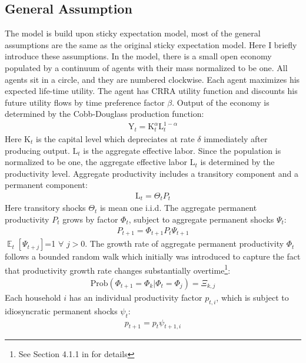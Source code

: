 \documentclass[12pt,letterpaper]{article}
\DeclareMathOperator{\E}{\mathbb{E}}
\begin{document}
\subsection{General Assumption}
The model is build upon \cite{StickyE} sticky expectation model, most of the general assumptions are the same as the original sticky expectation model. Here I briefly introduce these assumptions. In the model, there is a small open economy populated by a continuum of agents with their mass normalized to be one. All agents sit in a circle, and they are numbered clockwise. Each agent maximizes his expected life-time utility. The agent has CRRA utility function and discounts his future utility flows by time preference factor $\beta$. Output of the economy is determined by the Cobb-Douglass production function:
\begin{eqnarray}
\pmb{\mathrm{Y}}_{t}=\pmb{\mathrm{K}}_{t}^{\alpha}\pmb{\mathrm{L}}_{t}^{1-\alpha}
\end{eqnarray}
Here $\pmb{\mathrm{K}}_{t}$ is the capital level which depreciates at rate $\delta$ immediately after producing output. $\pmb{\mathrm{L}}_{t}$ is the aggregate effective labor. Since the population is normalized to be one, the aggregate effective labor $\pmb{\mathrm{L}}_{t}$ is determined by the productivity level. Aggregate productivity includes a transitory component and a permanent component:
\begin{eqnarray}
\pmb{\mathrm{L}}_{t}=\Theta_{t}P_{t}
\end{eqnarray}
Here transitory shocks $\Theta_{t}$ is mean one i.i.d. The aggregate permanent productivity $P_{t}$ grows by factor $\Phi_{t}$, subject to aggregate permanent shocks $\Psi_{t}$:
\begin{eqnarray}
P_{t+1}=\Phi_{t+1}P_{t}\Psi_{t+1}
\end{eqnarray}
$\E_{t}\left[\Psi_{t+j}\right]$=1 $\forall$ $j>0$. The growth rate of aggregate permanent productivity $\Phi_{t}$ follows a bounded random walk which initially was introduced to capture the fact that productivity growth rate changes substantially overtime\footnote{See Section 4.1.1 in \cite{StickyE} for details}:
\begin{eqnarray}
\text{Prob}(\Phi_{t+1}=\Phi_{k}|\Phi_{t}=\Phi_{j})=\Xi_{k,j}
\end{eqnarray}
Each household $i$ has an individual productivity factor $p_{t,i}$, which is subject to idiosyncratic permanent shocks $\psi_{t}$:
\begin{eqnarray} \label{Ind_p}
p_{t+1}=p_{t}\psi_{t+1,i}
\end{eqnarray}
\end{document}
